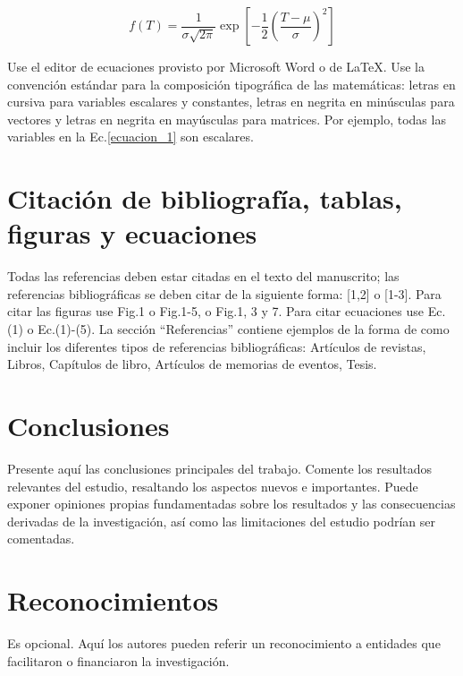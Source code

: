 \documentclass[10pt,letterpaper,twocolumn,twoside,fleqn]{article}
\begin{document}
\begin{equation}
f(T)=\frac{1}{\sigma \sqrt{2 \pi}} \exp \left[-\frac{1}{2} \left( \frac{T-\mu}{\sigma}\right)^{2} \right]
\label{ecuacion_1}
\end{equation}

Use el editor de ecuaciones provisto por Microsoft Word o de \LaTeX{}. Use la convención estándar para la composición tipográfica de las matemáticas: letras en cursiva para variables escalares y constantes, letras en negrita en minúsculas para vectores y letras en negrita en mayúsculas para matrices. Por ejemplo, todas las variables en la Ec.\eqref{ecuacion_1} son escalares.

\section{Citación de bibliografía, tablas, figuras y ecuaciones}
Todas las referencias deben estar citadas en el texto del manuscrito; las referencias bibliográficas se deben citar de la siguiente forma: [1,2] o [1-3].  Para citar las figuras use Fig.1 o Fig.1-5, o Fig.1, 3 y 7. Para citar ecuaciones use Ec.(1) o Ec.(1)-(5).  La sección “Referencias” contiene ejemplos de la forma de como incluir los diferentes tipos de referencias bibliográficas: Artículos de revistas, Libros, Capítulos de libro, Artículos de memorias de eventos, Tesis.
\section{Conclusiones}

Presente aquí las conclusiones principales del trabajo. Comente los resultados relevantes del estudio, resaltando los aspectos nuevos e importantes. Puede exponer opiniones propias fundamentadas sobre los resultados y las consecuencias derivadas de la investigación, así como las limitaciones del estudio podrían ser comentadas. 



\section*{Reconocimientos}
\vspace{-0.3cm}
Es opcional. Aquí los autores pueden referir un reconocimiento a entidades que facilitaron o financiaron la investigación.
\end{document}
